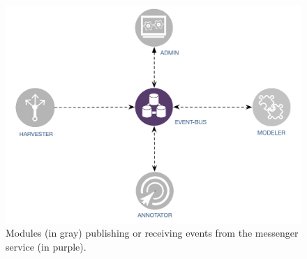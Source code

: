 \begin{figure} 
  \center
  \includegraphics[scale=0.45]{modulesBN}
  \caption{Modules (in gray) publishing or receiving events from the messenger service (in purple).}
  \label{fig:librairy-modules}
\end{figure}


